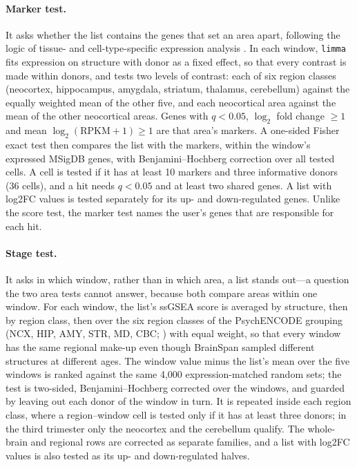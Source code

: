 \documentclass[pdflatex,sn-basic]{sn-jnl}
\begin{document}
\paragraph{Marker test.} It asks whether the list contains the genes that set an
area apart, following the logic of tissue- and cell-type-specific expression
analysis \citep{Dougherty2010,Xu2014}. In each window, \texttt{limma}
\citep{Ritchie2015} fits expression on structure with donor as a fixed effect,
so that every contrast is made within donors, and tests two levels of contrast:
each of six region classes (neocortex, hippocampus, amygdala, striatum,
thalamus, cerebellum) against the equally weighted mean of the other five, and
each neocortical area against the mean of the other neocortical areas. Genes
with $q < 0.05$, $\log_2$ fold change $\geq 1$ and mean
$\log_2(\mathrm{RPKM}+1) \geq 1$ are that area's markers. A one-sided Fisher
exact test then compares the list with the markers, within the window's
expressed MSigDB genes, with Benjamini--Hochberg correction over all tested
cells. A cell is tested if it has at least 10 markers and three informative
donors (36 cells), and a hit needs $q < 0.05$ and at least two shared genes. A
list with log2FC values is tested separately for its up- and down-regulated
genes. Unlike the score test, the marker test names the user's genes that are
responsible for each hit.

\paragraph{Stage test.} It asks in which window, rather than in which area, a
list stands out---a question the two area tests cannot answer, because both
compare areas within one window. For each window, the list's ssGSEA score is
averaged by structure, then by region class, then over the six region classes
of the PsychENCODE grouping (NCX, HIP, AMY, STR, MD, CBC; \citealp{Li2018}) with
equal weight, so that every window has the same regional make-up even though
BrainSpan sampled different structures at different ages. The window value minus
the list's mean over the five windows is ranked against the same 4{,}000
expression-matched random sets; the test is two-sided, Benjamini--Hochberg
corrected over the windows, and guarded by leaving out each donor of the window
in turn. It is repeated inside each region class, where a region--window cell is
tested only if it has at least three donors; in the third trimester only the
neocortex and the cerebellum qualify. The whole-brain and regional rows are
corrected as separate families, and a list with log2FC values is also tested as
its up- and down-regulated halves.
\end{document}
